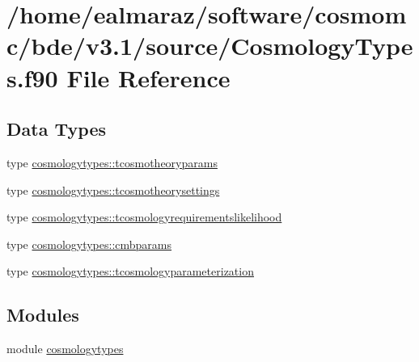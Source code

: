 \hypertarget{CosmologyTypes_8f90}{}\section{/home/ealmaraz/software/cosmomc/bde/v3.1/source/\+Cosmology\+Types.f90 File Reference}
\label{CosmologyTypes_8f90}
\subsection*{Data Types}
\begin{DoxyCompactItemize}
\item 
type \mbox{\hyperlink{structcosmologytypes_1_1tcosmotheoryparams}{cosmologytypes\+::tcosmotheoryparams}}
\item 
type \mbox{\hyperlink{structcosmologytypes_1_1tcosmotheorysettings}{cosmologytypes\+::tcosmotheorysettings}}
\item 
type \mbox{\hyperlink{structcosmologytypes_1_1tcosmologyrequirementslikelihood}{cosmologytypes\+::tcosmologyrequirementslikelihood}}
\item 
type \mbox{\hyperlink{structcosmologytypes_1_1cmbparams}{cosmologytypes\+::cmbparams}}
\item 
type \mbox{\hyperlink{structcosmologytypes_1_1tcosmologyparameterization}{cosmologytypes\+::tcosmologyparameterization}}
\end{DoxyCompactItemize}
\subsection*{Modules}
\begin{DoxyCompactItemize}
\item 
module \mbox{\hyperlink{namespacecosmologytypes}{cosmologytypes}}
\end{DoxyCompactItemize}
